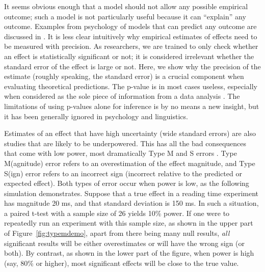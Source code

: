 \documentclass{cambridge7A}\usepackage[]{graphicx}\usepackage[]{color}
\begin{document}
It seems obvious enough that a model should not allow any possible
empirical outcome; such a model is not particularly useful
because it can ``explain'' any outcome. Examples from psychology of models that can predict any outcome are discussed in \cite{rp}. 
It is less clear intuitively why
empirical estimates of effects need to be measured with precision. As
researchers, we are trained to only check whether an effect is
statistically significant or not; it is considered irrelevant whether 
the standard error of the effect is large or not. Here, we show why 
the precision of the estimate (roughly speaking, the standard error)
is a crucial component when evaluating theoretical predictions. The
p-value is in most cases useless, especially when considered as the
sole piece of information from a data analysis \citep{pvals}. The limitations of using p-values alone for inference is by no means a new insight, but it has been generally ignored in psychology and linguistics.

Estimates of an effect that have high uncertainty (wide standard
errors) are also studies that are likely to be underpowered.  This has
all the bad consequences that come with low power, most dramatically  
Type M and  S errors \citep{GelmanCarlin2014}. Type M(agnitude) error
refers to an overestimation of the effect magnitude, and Type S(ign)
error refers to an incorrect sign (incorrect relative to the predicted
or expected effect). Both types of error occur when power is low, as 
the following simulation demonstrates.  Suppose that a true effect in
a reading time experiment has magnitude 20 ms, and that standard
deviation is 150 ms. In such a situation, a paired t-test with a 
sample size of 26 yields 10\% power. If one were to repeatedly run an
experiment with this sample size, as shown in the upper part of
Figure~\ref{fig:typemdemo}, apart from there being many null results, 
\textit{all} significant results will be either overestimates or will have the
wrong sign (or both). By contrast, as shown in the lower part of the
figure, when power is high (say, 80\% or higher), most significant
effects will be close to the true value.
\end{document}
